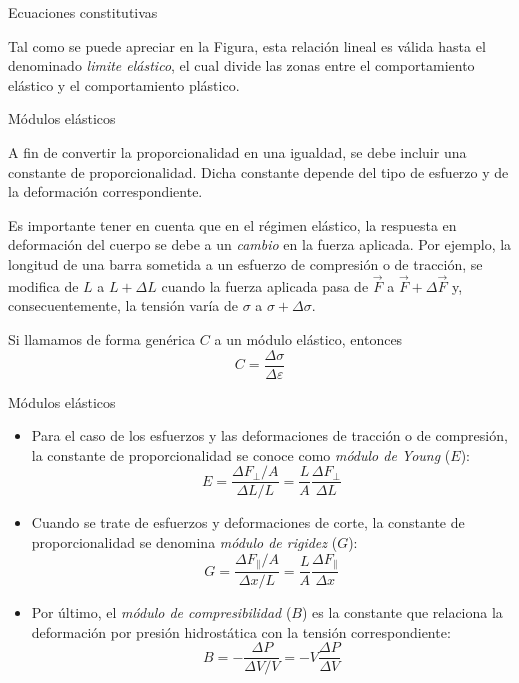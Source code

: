 \documentclass[11pt,handout,aspectratio=1610]{beamer}
\newcommand{\vs}{\vspace{11pt}}
\begin{document}
\begin{frame}{Ecuaciones constitutivas}
    \vs

    Tal como se puede apreciar en la Figura, esta relación lineal es válida hasta el denominado \emph{limite elástico}, el cual divide las zonas entre el comportamiento elástico y el comportamiento plástico.

\end{frame}

\begin{frame}{Módulos elásticos}

    A fin de convertir la proporcionalidad en una igualdad, se debe incluir una constante de proporcionalidad. Dicha constante depende del tipo de esfuerzo y de la deformación correspondiente.

    \vs

    Es importante tener en cuenta que en el régimen elástico, la respuesta en deformación del cuerpo se debe a un \emph{cambio} en la fuerza aplicada. Por ejemplo, la longitud de una barra sometida a un esfuerzo de compresión o de tracción, se modifica de $L$ a $L + \Delta L$ cuando la fuerza aplicada pasa de $\vec{F}$ a $\vec{F} + \Delta \vec{F}$ y, consecuentemente, la tensión varía de $\sigma$ a $\sigma + \Delta \sigma$.

    \vs

    Si llamamos de forma genérica $C$ a un módulo elástico, entonces $$C = \frac{\Delta \sigma}{\Delta \varepsilon} $$
    
\end{frame}

\begin{frame}{Módulos elásticos}

    \begin{itemize}
        \item Para el caso de los esfuerzos y las deformaciones de tracción o de compresión, la constante de proporcionalidad se conoce como \emph{módulo de Young} ($E$): $$ E = \frac{\Delta F_\perp/A}{\Delta L /L} = \frac{L}{A} \frac{\Delta F_\perp}{\Delta L} $$
        \item Cuando se trate de esfuerzos y deformaciones de corte, la constante de proporcionalidad se denomina \emph{módulo de rigidez} ($G$): $$ G = \frac{\Delta F_\parallel/A}{\Delta x / L} = \frac{L}{A} \frac{\Delta F_\parallel}{\Delta x}$$
        \item Por último, el \emph{módulo de compresibilidad} ($B$) es la constante que relaciona la deformación por presión hidrostática con la tensión correspondiente: $$ B = - \frac{\Delta P}{\Delta V / V} = - V \frac{\Delta P}{\Delta V} $$
    \end{itemize}

\end{frame}
\end{document}
